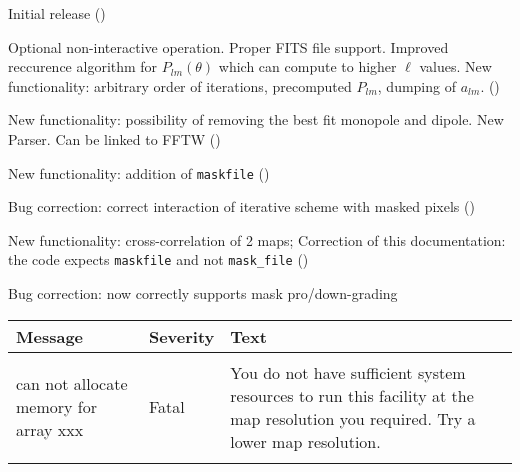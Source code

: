 \begin{release}
  \begin{relist}
    \item Initial release ()
    \item Optional non-interactive operation. Proper FITS file
    support. Improved reccurence algorithm for $P_{lm}(\theta)$ which can compute to higher $\ell$ values. New functionality: arbitrary order of iterations, precomputed
    $P_{lm}$, dumping of $a_{lm}$. ()
    \item New functionality: possibility of removing the best fit monopole
    and dipole. New Parser. Can be linked to FFTW ()
    \item New functionality: addition of {\tt{maskfile}} ()
    \item Bug correction: correct interaction of iterative scheme with masked pixels ()
    \item New functionality: cross-correlation of 2 maps; Correction of this documentation: the code expects {\tt maskfile} and
not {\tt mask\_file}  ()
    \item Bug correction: now correctly supports mask pro/down-grading
  \end{relist}
\end{release}

\begin{messages}
{
\begin{tabular}{p{0.25\hsize} p{0.1\hsize} p{0.35\hsize}} \hline  
  \textbf{Message} & \textbf{Severity} & \textbf{Text} \\ \hline
                   &                   &   \\ %
can not allocate memory for array xxx &  Fatal & You do not have
                   sufficient system resources to run this
                   facility at the map resolution you required. 
  Try a lower map resolution.  \\ 
                   &                   &   \\ \hline %
\end{tabular}
} 
\end{messages}
%
\newpage
%
